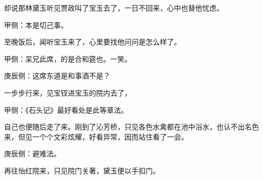 \begin{parag}
    却说那林黛玉听见贾政叫了宝玉去了，一日不回来，心中也替他忧虑。\begin{note}甲侧：本是切己事。\end{note}至晚饭后，闻听宝玉来了，心里要找他问问是怎么样了。\begin{note}甲侧：呆兄此席，的是合和筵也。一笑。\end{note}\begin{note}庚辰侧：这席东道是和事酒不是？\end{note}一步步行来，见宝钗进宝玉的院内去了，\begin{note}甲侧：《石头记》最好看处是此等章法。\end{note}自己也便随后走了来。刚到了沁芳桥，只见各色水禽都在池中浴水，也认不出名色来，但见一个个文彩炫耀，好看异常，因而站住看了一会。\begin{note}庚辰侧：避难法。\end{note}再往怡红院来，只见院门关著，黛玉便以手扣门。
\end{parag}


